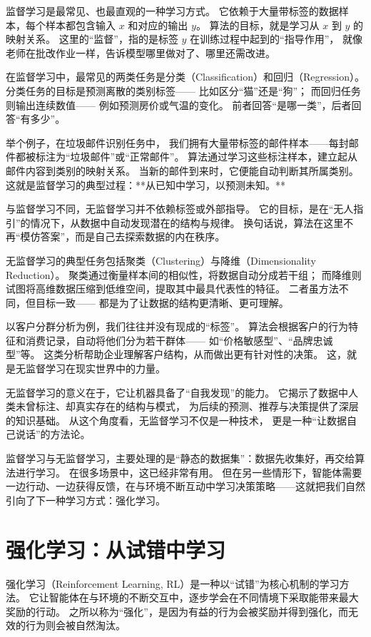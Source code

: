 监督学习是最常见、也最直观的一种学习方式。  
它依赖于大量带标签的数据样本，每个样本都包含输入 $x$ 和对应的输出 $y$。  
算法的目标，就是学习从 $x$ 到 $y$ 的映射关系。  
这里的“监督”，指的是标签 $y$ 在训练过程中起到的“指导作用”，  
就像老师在批改作业一样，告诉模型哪里做对了、哪里还需改进。

在监督学习中，最常见的两类任务是分类（Classification）和回归（Regression）。  
分类任务的目标是预测离散的类别标签——  
比如区分“猫”还是“狗”；  
而回归任务则输出连续数值——  
例如预测房价或气温的变化。  
前者回答“是哪一类”，后者回答“有多少”。

举个例子，在垃圾邮件识别任务中，  
我们拥有大量带标签的邮件样本——每封邮件都被标注为“垃圾邮件”或“正常邮件”。  
算法通过学习这些标注样本，建立起从邮件内容到类别的映射关系。  
当新的邮件到来时，它便能自动判断其所属类别。  
这就是监督学习的典型过程：**从已知中学习，以预测未知。**

与监督学习不同，无监督学习并不依赖标签或外部指导。  
它的目标，是在“无人指引”的情况下，从数据中自动发现潜在的结构与规律。  
换句话说，算法在这里不再“模仿答案”，而是自己去探索数据的内在秩序。

无监督学习的典型任务包括聚类（Clustering）与降维（Dimensionality Reduction）。  
聚类通过衡量样本间的相似性，将数据自动分成若干组；  
而降维则试图将高维数据压缩到低维空间，提取其中最具代表性的特征。  
二者虽方法不同，但目标一致——  
都是为了让数据的结构更清晰、更可理解。

以客户分群分析为例，我们往往并没有现成的“标签”。  
算法会根据客户的行为特征和消费记录，自动将他们分为若干群体——  
如“价格敏感型”、“品牌忠诚型”等。  
这类分析帮助企业理解客户结构，从而做出更有针对性的决策。  
这，就是无监督学习在现实世界中的力量。

无监督学习的意义在于，它让机器具备了“自我发现”的能力。  
它揭示了数据中人类未曾标注、却真实存在的结构与模式，  
为后续的预测、推荐与决策提供了深层的知识基础。  
从这个角度看，无监督学习不仅是一种技术，  
更是一种“让数据自己说话”的方法论。

监督学习与无监督学习，主要处理的是“静态的数据集”：数据先收集好，再交给算法进行学习。  
在很多场景中，这已经非常有用。  
但在另一些情形下，智能体需要一边行动、一边获得反馈，在与环境不断互动中学习决策策略——这就把我们自然引向了下一种学习方式：强化学习。

\section{强化学习：从试错中学习}

强化学习（Reinforcement Learning, RL）是一种以“试错”为核心机制的学习方法。  
它让智能体在与环境的不断交互中，逐步学会在不同情境下采取能带来最大奖励的行动。  
之所以称为“强化”，是因为有益的行为会被奖励并得到强化，而无效的行为则会被自然淘汰。

